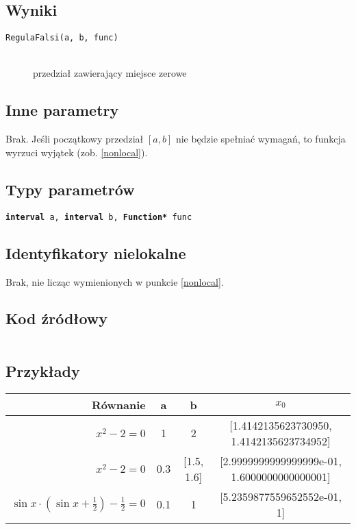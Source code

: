 \documentclass[12pt]{article}
\begin{document}
		\subsection{Wyniki}
			\begin{description}
				\item[\texttt{RegulaFalsi(a, b, func)}] \hfill\\
					przedział zawierający miejsce zerowe
			\end{description}

		\subsection{Inne parametry}
			Brak. Jeśli początkowy przedział $[a, b]$ nie będzie spełniać wymagań, to funkcja wyrzuci wyjątek (zob. \ref{nonlocal}).

		\subsection{Typy parametrów}
			\texttt{\textbf{interval} a, \textbf{interval} b, \textbf{Function*} func}

		\subsection{Identyfikatory nielokalne}
      Brak, nie licząc wymienionych w punkcie \ref{nonlocal}.

		\subsection{Kod źródłowy}
			\inputminted[firstline=3, lastline=36]{c++}{../solvers/regulafalsi.cpp}

		\subsection{Przykłady}
			\begin{tabular}{|r|c|c||c|}
				\hline
				Równanie & a & b & $x_0$ \\\hline

				$x^2 - 2 = 0$ & 1 & 2 & [1.4142135623730950, 1.4142135623734952]\\\hline
				$x^2 - 2 = 0$ & 0.3 & [1.5, 1.6] & [2.9999999999999999e-01, 1.6000000000000001]\\\hline
				$\sin{x} \cdot (\sin{x} + \frac{1}{2}) - \frac{1}{2} = 0$ & 0.1 & 1 & [5.2359877559652552e-01, 1] \\\hline

			\end{tabular}
\end{document}
